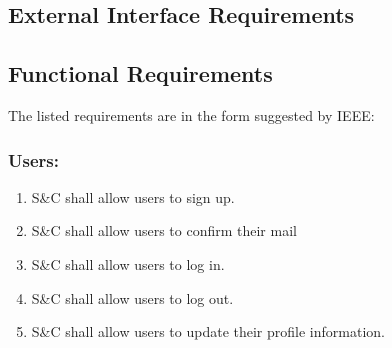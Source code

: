 

\subsection{External Interface Requirements}

\subsection{Functional Requirements}
    The listed requirements are in the form suggested by IEEE: 
    \newline
    \subsubsection*{Users:}
        \begin{enumerate}[label=\textbf{R\arabic*}]
            \item S\&C shall allow users to sign up.                    %
            \item S\&C shall allow users to confirm their mail          %
            \item S\&C shall allow users to log in.                     %
            \item S\&C shall allow users to log out.                    %
            \item S\&C shall allow users to update their profile information.       %
                       
        \end{enumerate}
        
